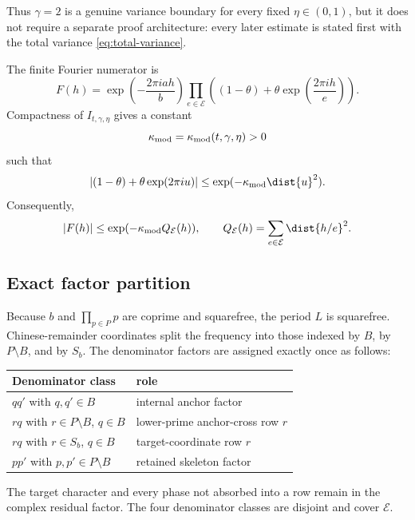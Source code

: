Thus $\gamma=2$ is a genuine variance boundary for every fixed $\eta\in(0,1)$, but it does not require a separate proof architecture: every later estimate is stated first with the total variance \cref{eq:total-variance}.

The finite Fourier numerator is
\begin{equation}
\label{eq:Fh-definition}
 F(h)=\exp\left(-\frac{2\pi i a h}{b}\right)
 \prod_{e\in\mathcal E}
 \left((1-\theta)+\theta\exp\left(\frac{2\pi i h}{e}\right)\right).
\end{equation}
Compactness of $I_{t,\gamma,\eta}$ gives a constant
\[
 \kappa_{\rm mod}=\kappa_{\rm mod}(t,\gamma,\eta)>0
\]
such that
\begin{equation}
\label{eq:bernoulli-modulus}
 |(1-\theta)+\theta\exp(2\pi i u)|
 \leq\exp(-\kappa_{\rm mod}\dist{u}^2).
\end{equation}
Consequently,
\begin{equation}
\label{eq:global-Fourier-energy}
 |F(h)|\leq\exp(-\kappa_{\rm mod}Q_{\mathcal E}(h)),
 \qquad
 Q_{\mathcal E}(h)=\sum_{e\in\mathcal E}\dist{h/e}^2.
\end{equation}

\subsection{Exact factor partition}

Because $b$ and $\prod_{p\in P}p$ are coprime and squarefree, the period $L$ is squarefree.  Chinese-remainder coordinates split the frequency into those indexed by $B$, by $P\setminus B$, and by $S_b$.  The denominator factors are assigned exactly once as follows:
\begin{center}
\begin{tabular}{ll}
\toprule
Denominator class & role \\
\midrule
$q q'$ with $q,q'\in B$ & internal anchor factor \\
$r q$ with $r\in P\setminus B$, $q\in B$ & lower-prime anchor-cross row $r$ \\
$r q$ with $r\in S_b$, $q\in B$ & target-coordinate row $r$ \\
$p p'$ with $p,p'\in P\setminus B$ & retained skeleton factor \\
\bottomrule
\end{tabular}
\end{center}
The target character and every phase not absorbed into a row remain in the complex residual factor.  The four denominator classes are disjoint and cover $\mathcal E$.
